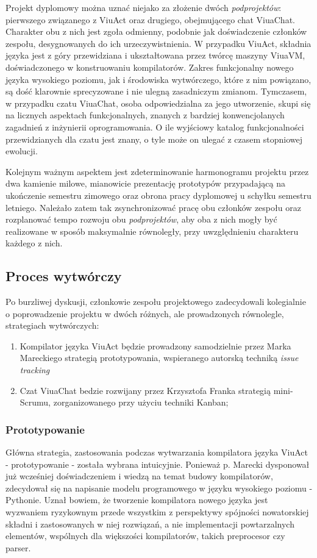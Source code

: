 \documentclass[11pt,oneside,a4paper,titlepage,onecolumn]{article}
\begin{document}
Projekt dyplomowy można uznać niejako za złożenie dwóch \textit{podprojektów}: pierwszego związanego z ViuAct oraz drugiego, obejmującego chat ViuaChat. Charakter obu z nich jest zgoła odmienny, podobnie jak doświadczenie członków zespołu, desygnowanych do ich urzeczywistnienia. W przypadku ViuAct, składnia języka jest z góry przewidziana i ukształtowana przez twórcę maszyny ViuaVM, doświadczonego w konstruowaniu kompilatorów. Zakres funkcjonalny nowego języka wysokiego poziomu, jak i środowiska wytwórczego, które z nim powiązano, są dość klarownie sprecyzowane i nie ulegną zasadniczym zmianom. Tymczasem, w przypadku czatu ViuaChat, osoba odpowiedzialna za jego utworzenie, skupi się na licznych aspektach funkcjonalnych, znanych z bardziej konwencjolanych zagadnień z inżynierii oprogramowania. O ile wyjściowy katalog funkcjonalności przewidzianych dla czatu jest znany, o tyle może on ulegać z czasem stopniowej ewolucji.

Kolejnym ważnym aspektem jest zdeterminowanie harmonogramu projektu przez dwa kamienie milowe, mianowicie prezentację prototypów przypadającą na ukończenie semestru zimowego oraz obrona pracy dyplomowej u schyłku semestru letniego. Należało zatem tak zsynchronizować pracę obu członków zespołu oraz rozplanować tempo rozwoju obu \textit{podprojektów}, aby oba z nich mogły być realizowane w sposób maksymalnie równoległy, przy uwzględnieniu charakteru każdego z nich.

\subsection{Proces wytwórczy}

Po burzliwej dyskusji, członkowie zespołu projektowego zadecydowali kolegialnie o poprowadzenie projektu w dwóch
różnych, ale prowadzonych równolegle, strategiach wytwórczych:

\begin{enumerate}
	\item Kompilator języka ViuAct będzie prowadzony samodzielnie przez Marka Mareckiego strategią prototypowania, wspieranego autorską techniką \textit{issue tracking}
	\item Czat ViuaChat bedzie rozwijany przez Krzysztofa Franka strategią mini-Scrumu, zorganizowanego przy użyciu techniki Kanban;
\end{enumerate}

\subsubsection{Prototypowanie}
Główna strategia, zastosowania podczas wytwarzania kompilatora języka ViuAct - prototypowanie - została 
wybrana intuicyjnie. Ponieważ p. Marecki dysponował już wcześniej 
doświadczeniem i wiedzą na temat budowy kompilatorów, zdecydował się na napisanie modelu programowego w
języku wysokiego poziomu - Pythonie. Uznał bowiem, że tworzenie kompilatora nowego języka jest wyzwaniem 
ryzykownym przede wszystkim z perspektywy spójności nowatorskiej składni i zastosowanych w niej rozwiązań, a nie 
implementacji powtarzalnych elementów, wspólnych dla większości kompilatorów, takich preprocesor czy parser.
\end{document}
